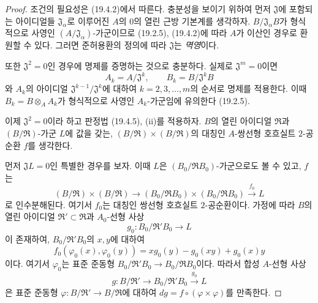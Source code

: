 
\begin{proof}
조건의 필요성은 (19.4.2)에서 따른다. 충분성을 보이기 위하여 먼저
$\mathfrak J$에 포함되는 아이디얼들
$\mathfrak J_\alpha$로 이루어진 $A$의 $0$의 열린 근방 기본계를
생각하자. $B/\mathfrak J_\alpha B$가 형식적으로 사영인
$(A/\mathfrak J_\alpha)$-가군이므로 (19.2.5), (19.4.2)에 따라
$A$가 이산인 경우로 환원할 수 있다. 그러면 준허용환의 정의에
따라 $\mathfrak J$는 \emph{멱영}이다.

또한 $\mathfrak J^2=0$인 경우에 명제를 증명하는 것으로 충분하다.
실제로 $\mathfrak J^m=0$이면
\[
  A_k=A/\mathfrak J^k,\qquad B_k=B/\mathfrak J^kB
\]
와 $A_k$의 아이디얼
$\mathfrak J^{k-1}/\mathfrak J^k$에 대하여 $k=2,3,\ldots,m$의
순서로 명제를 적용한다. 이때
$B_k=B\otimes_A A_k$가 형식적으로 사영인 $A_k$-가군임에
유의한다 (19.2.5).

이제 $\mathfrak J^2=0$이라 하고 판정법 (19.4.5), (ii)를
적용하자. $B$의 열린 아이디얼 $\mathfrak R$과
$(B/\mathfrak R)$-가군 $L$에 값을 갖는,
$(B/\mathfrak R)\times(B/\mathfrak R)$의 대칭인
$A$-쌍선형 호흐실트 $2$-공순환 $f$를 생각한다.

먼저 $\mathfrak JL=0$인 특별한 경우를 보자. 이때 $L$은
$(B_0/\mathfrak R B_0)$-가군으로도 볼 수 있고, $f$는
\[
  (B/\mathfrak R)\times(B/\mathfrak R)
  \longrightarrow
  (B_0/\mathfrak R B_0)\times(B_0/\mathfrak R B_0)
  \xrightarrow{f_0}L
\]
로 인수분해된다. 여기서 $f_0$는 대칭인 쌍선형 호흐실트
$2$-공순환이다. 가정에 따라 $B$의 열린 아이디얼
$\mathfrak R'\subset\mathfrak R$과 $A_0$-선형 사상
\[
  g_0:B_0/\mathfrak R'B_0\longrightarrow L
\]
이 존재하여, $B_0/\mathfrak R'B_0$의 $x,y$에 대하여
\[
  f_0(\varphi_0(x),\varphi_0(y))
  =xg_0(y)-g_0(xy)+g_0(x)y
\]
이다. 여기서 $\varphi_0$는 표준 준동형
$B_0/\mathfrak R'B_0\to B_0/\mathfrak R B_0$이다. 따라서 합성
$A$-선형 사상
\[
  g:B/\mathfrak R'\longrightarrow
  B_0/\mathfrak R'B_0\xrightarrow{g_0}L
\]
은 표준 준동형
$\varphi:B/\mathfrak R'\to B/\mathfrak R$에 대하여
$dg=f\circ(\varphi\times\varphi)$를 만족한다.


\end{proof}
